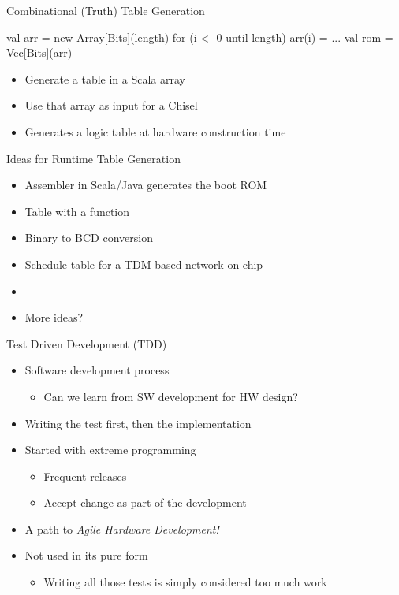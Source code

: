 \begin{frame}[fragile]{Combinational (Truth) Table Generation}
\begin{chisel}
val arr = new Array[Bits](length)
for (i <- 0 until length) {
  arr(i) = ...
}
val rom = Vec[Bits](arr)
\end{chisel}
\begin{itemize}
\item Generate a table in a Scala array
\item Use that array as input for a Chisel 
\item Generates a logic table at hardware construction time
\end{itemize}
\end{frame}

\begin{frame}[fragile]{Ideas for Runtime Table Generation}
\begin{itemize}
\item Assembler in Scala/Java generates the boot ROM
\item Table with a  function
\item Binary to BCD conversion
\item Schedule table for a TDM-based network-on-chip
\item 
\item More ideas?
\end{itemize}
\end{frame}

\begin{frame}[fragile]{Test Driven Development (TDD)}
\begin{itemize}
\item Software development process
\begin{itemize}
\item Can we learn from SW development for HW design?
\end{itemize}
\item Writing the test first, then the implementation
\item Started with extreme programming
\begin{itemize}
\item Frequent releases
\item Accept change as part of the development
\end{itemize}
\item A path to \emph{Agile Hardware Development!}
\item Not used in its pure form
\begin{itemize}
\item Writing all those tests is simply considered too much work
\end{itemize}
\end{itemize}
\end{frame}

